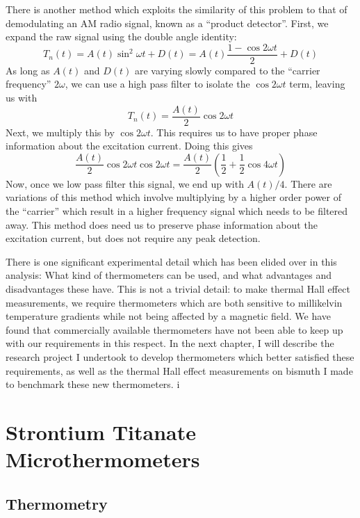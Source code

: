 \documentclass{thesis-umich}
\begin{document}
There is another method which exploits the similarity of this problem to that of demodulating an AM radio signal, known as a ``product detector''. First, we expand the raw signal using the double angle identity:
\[T_n(t) = A(t) \sin^2 \omega t + D(t) = A(t) \frac{1 - \cos 2 \omega t}{2} + D(t)\]
As long as $A(t)$ and $D(t)$ are varying slowly compared to the ``carrier frequency'' $2\omega$, we can use a high pass filter to isolate the $\cos 2\omega t$ term, leaving us with
\[T_n(t) = \frac{A(t)}{2}\cos 2\omega t\]
Next, we multiply this by $\cos 2 \omega t$. This requires us to have proper phase information about the excitation current. Doing this gives
\[ \frac{A(t)}{2} \cos 2 \omega t \cos 2 \omega t = \frac{A(t)}{2}\left(\frac{1}{2} + \frac{1}{2} \cos 4 \omega t \right) \]
Now, once we low pass filter this signal, we end up with $A(t)/4$. There are variations of this method which involve multiplying by a higher order power of the ``carrier'' which result in a higher frequency signal which needs to be filtered away. This method does need us to preserve phase information about the excitation current, but does not require any peak detection.

There is one significant experimental detail which has been elided over in this analysis: What kind of thermometers can be used, and what advantages and disadvantages these have. This is not a trivial detail: to make thermal Hall effect measurements, we require thermometers which are both sensitive to millikelvin temperature gradients while not being affected by a magnetic field. We have found that commercially available thermometers have not been able to keep up with our requirements in this respect. In the next chapter, I will describe the research project I undertook to develop thermometers which better satisfied these requirements, as well as the thermal Hall effect measurements on bismuth I made to benchmark these new thermometers.
i
\chapter{Strontium Titanate Microthermometers}


\section{Thermometry}
\end{document}
